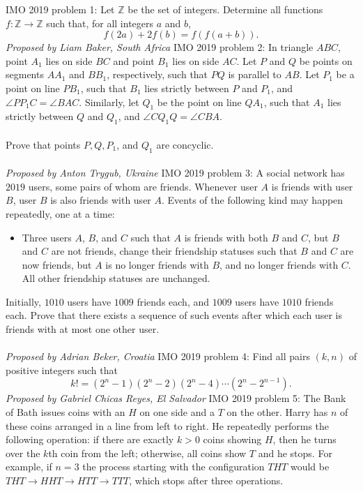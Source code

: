 IMO 2019 problem 1:  Let $\mathbb{Z}$ be the set of integers. Determine all functions $f: \mathbb{Z} \rightarrow \mathbb{Z}$ such that, for all integers $a$ and $b$,
\[ f(2a)+2f(b)=f(f(a+b)). \]
\textit{Proposed by Liam Baker, South Africa} 
IMO 2019 problem 2:  In triangle $ABC$, point $A_1$ lies on side $BC$ and point $B_1$ lies on side $AC$. Let $P$ and $Q$ be points on segments $AA_1$ and $BB_1$, respectively, such that $PQ$ is parallel to $AB$. Let $P_1$ be a point on line $PB_1$, such that $B_1$ lies strictly between $P$ and $P_1$, and $\angle PP_1C=\angle BAC$. Similarly, let $Q_1$ be the point on line $QA_1$, such that $A_1$ lies strictly between $Q$ and $Q_1$, and $\angle CQ_1Q=\angle CBA$. \\\\
Prove that points $P,Q,P_1$, and $Q_1$ are concyclic. \\\\
\textit{Proposed by Anton Trygub, Ukraine} 
IMO 2019 problem 3:  A social network has $2019$ users, some pairs of whom are friends. Whenever user $A$ is friends with user $B$, user $B$ is also friends with user $A$. Events of the following kind may happen repeatedly, one at a time:
\begin{itemize}
  \item Three users $A$, $B$, and $C$ such that $A$ is friends with both $B$ and $C$, but $B$ and $C$ are not friends, change their friendship statuses such that $B$ and $C$ are now friends, but $A$ is no longer friends with $B$, and no longer friends with $C$. All other friendship statuses are unchanged.
\end{itemize}
Initially, $1010$ users have $1009$ friends each, and $1009$ users have $1010$ friends each. Prove that there exists a sequence of such events after which each user is friends with at most one other user. \\\\
\textit{Proposed by Adrian Beker, Croatia} 
IMO 2019 problem 4:  Find all pairs $(k,n)$ of positive integers such that
\[ k!=(2^n-1)(2^n-2)(2^n-4)\cdots(2^n-2^{n-1}). \]
\textit{Proposed by Gabriel Chicas Reyes, El Salvador} 
IMO 2019 problem 5:  The Bank of Bath issues coins with an $H$ on one side and a $T$ on the other. Harry has $n$ of these coins arranged in a line from left to right. He repeatedly performs the following operation: if there are exactly $k>0$ coins showing $H$, then he turns over the $k$th coin from the left; otherwise, all coins show $T$ and he stops. For example, if $n=3$ the process starting with the configuration $THT$ would be $THT \to HHT  \to HTT \to TTT$, which stops after three operations.
